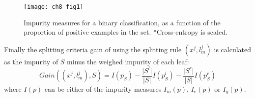   \begin{figure}[t!]
 \texttt{[image: ch8\_fig1]}
 \caption{Impurity measures for a binary classification, as a function of the proportion of
 positive examples in the set. *Cross-entropy is scaled.\citep{Hastie2009} }
 \label{measures1}
 \end{figure} 

 Finally the splitting criteria gain of using the splitting rule $(x^j,l^j_m)$ is calculated as 
 the impurity of $S$ minus the weighed impurity of each leaf:
 \begin{equation}
 Gain((x^j,l^j_m),S)=I(p_S)-\frac{\vert S^l \vert}{\vert S \vert}I(p^l_S)
 -\frac{\vert S^r \vert}{\vert S \vert}I(p^r_S)
 \end{equation} 
 where $I(p)$ can be either of the impurity measures $I_m(p)$, $I_e(p)$ or $I_g(p)$.
 
